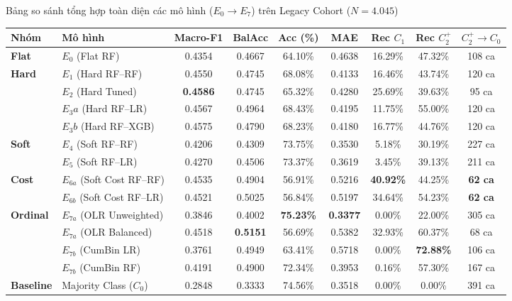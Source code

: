 \begin{table}{Bảng so sánh tổng hợp toàn diện các mô hình ($E_0 \to E_7$) trên Legacy Cohort ($N = 4.045$)}
\centering
\footnotesize
\setlength{\tabcolsep}{4pt}
\label{tab:master-comparison}
\begin{tabularx}{\textwidth}{l X c c c c c c c}
\toprule
\textbf{Nhóm} & \textbf{Mô hình} & \textbf{Macro-F1} & \textbf{BalAcc} & \textbf{Acc (\%)} & \textbf{MAE} & \textbf{Rec $C_1$} & \textbf{Rec $C_2^+$} & \textbf{$C_2^+ \to C_0$} \\
\midrule
\textbf{Flat} & $E_0$ (Flat RF) & 0.4354 & 0.4667 & 64.10\% & 0.4638 & 16.29\% & 47.32\% & 108 ca \\
\midrule
\multirow{4}{*}{\textbf{Hard}} 
  & $E_1$ (Hard RF--RF) & 0.4550 & 0.4745 & 68.08\% & 0.4133 & 16.46\% & 43.74\% & 120 ca \\
  & $E_2$ (Hard Tuned)  & \textbf{0.4586} & 0.4745 & 65.32\% & 0.4280 & 25.69\% & 39.63\% & 95 ca \\
  & $E_3a$ (Hard RF--LR)& 0.4567 & 0.4964 & 68.43\% & 0.4195 & 11.75\% & 55.00\% & 120 ca \\
  & $E_3b$ (Hard RF--XGB)& 0.4575 & 0.4790 & 68.23\% & 0.4180 & 16.77\% & 44.76\% & 120 ca \\
\midrule
\multirow{2}{*}{\textbf{Soft}} 
  & $E_4$ (Soft RF--RF) & 0.4206 & 0.4309 & 73.75\% & 0.3530 & 5.18\% & 30.19\% & 227 ca \\
  & $E_5$ (Soft RF--LR) & 0.4270 & 0.4506 & 73.37\% & 0.3619 & 3.45\% & 39.13\% & 211 ca \\
\midrule
\multirow{2}{*}{\textbf{Cost}}
  & $E_{6a}$ (Soft Cost RF--RF) & 0.4535 & 0.4904 & 56.91\% & 0.5216 & \textbf{40.92\%} & 44.25\% & \textbf{62 ca} \\
  & $E_{6b}$ (Soft Cost RF--LR) & 0.4521 & 0.5025 & 56.84\% & 0.5197 & 34.64\% & 54.23\% & \textbf{62 ca} \\
\midrule
\multirow{4}{*}{\textbf{Ordinal}} 
  & $E_{7a}$ (OLR Unweighted)& 0.3846 & 0.4002 & \textbf{75.23\%} & \textbf{0.3377} & 0.00\% & 22.00\% & 305 ca \\
  & $E_{7a}$ (OLR Balanced)  & 0.4518 & \textbf{0.5151} & 56.69\% & 0.5382 & 32.93\% & 60.37\% & 68 ca \\
  & $E_{7b}$ (CumBin LR)     & 0.3761 & 0.4949 & 63.41\% & 0.5718 & 0.00\% & \textbf{72.88\%} & 106 ca \\
  & $E_{7b}$ (CumBin RF)     & 0.4191 & 0.4900 & 72.34\% & 0.3953 & 0.16\% & 57.30\% & 167 ca \\
\midrule
\textbf{Baseline} & Majority Class ($C_0$) & 0.2848 & 0.3333 & 74.56\% & 0.3518 & 0.00\% & 0.00\% & 391 ca \\
\bottomrule
\end{tabularx}
\end{table}

